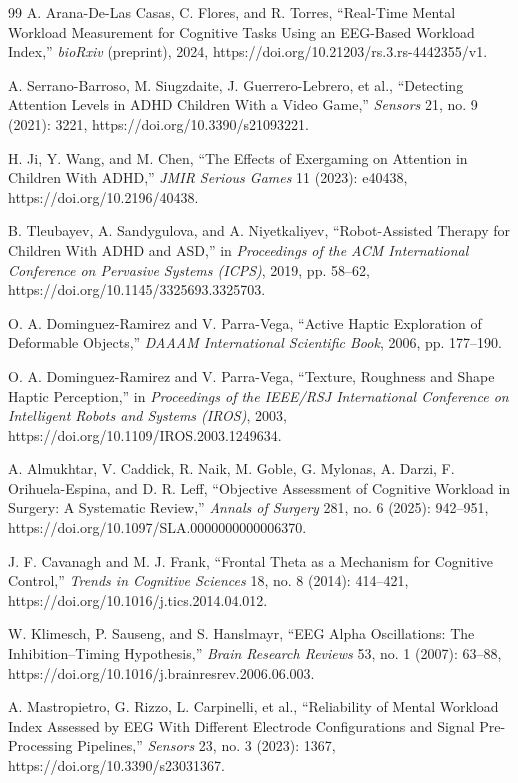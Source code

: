\documentclass[10pt]{iopart}
\begin{document}
\begin{thebibliography}{99}
A. Arana-De-Las Casas, C. Flores, and R. Torres, ``Real-Time Mental
Workload Measurement for Cognitive Tasks Using an EEG-Based Workload
Index,'' \textit{bioRxiv} (preprint), 2024,
https://doi.org/10.21203/rs.3.rs-4442355/v1.

A. Serrano-Barroso, M. Siugzdaite, J. Guerrero-Lebrero, et al.,
``Detecting Attention Levels in ADHD Children With a Video Game,''
\textit{Sensors} 21, no. 9 (2021): 3221,
https://doi.org/10.3390/s21093221.

H. Ji, Y. Wang, and M. Chen, ``The Effects of Exergaming on Attention
in Children With ADHD,''
\textit{JMIR Serious Games} 11 (2023): e40438,
https://doi.org/10.2196/40438.

B. Tleubayev, A. Sandygulova, and A. Niyetkaliyev,
``Robot-Assisted Therapy for Children With ADHD and ASD,''
in \textit{Proceedings of the ACM International Conference on
Pervasive Systems (ICPS)}, 2019, pp. 58--62,
https://doi.org/10.1145/3325693.3325703.

O. A. Dominguez-Ramirez and V. Parra-Vega, ``Active Haptic Exploration
of Deformable Objects,''
\textit{DAAAM International Scientific Book},
2006, pp. 177--190.

O. A. Dominguez-Ramirez and V. Parra-Vega, ``Texture, Roughness and
Shape Haptic Perception,''
in \textit{Proceedings of the IEEE/RSJ International Conference on
Intelligent Robots and Systems (IROS)}, 2003,
https://doi.org/10.1109/IROS.2003.1249634.

A. Almukhtar, V. Caddick, R. Naik, M. Goble, G. Mylonas, A. Darzi,
F. Orihuela-Espina, and D. R. Leff,
``Objective Assessment of Cognitive Workload in Surgery: A Systematic
Review,''
\textit{Annals of Surgery} 281, no. 6 (2025): 942--951,
https://doi.org/10.1097/SLA.0000000000006370.

J. F. Cavanagh and M. J. Frank, ``Frontal Theta as a Mechanism for
Cognitive Control,''
\textit{Trends in Cognitive Sciences} 18, no. 8 (2014): 414--421,
https://doi.org/10.1016/j.tics.2014.04.012.

W. Klimesch, P. Sauseng, and S. Hanslmayr, ``EEG Alpha Oscillations:
The Inhibition--Timing Hypothesis,''
\textit{Brain Research Reviews} 53, no. 1 (2007): 63--88,
https://doi.org/10.1016/j.brainresrev.2006.06.003.

A. Mastropietro, G. Rizzo, L. Carpinelli, et al.,
``Reliability of Mental Workload Index Assessed by EEG With Different
Electrode Configurations and Signal Pre-Processing Pipelines,''
\textit{Sensors} 23, no. 3 (2023): 1367,
https://doi.org/10.3390/s23031367.


\end{thebibliography}
\end{document}
